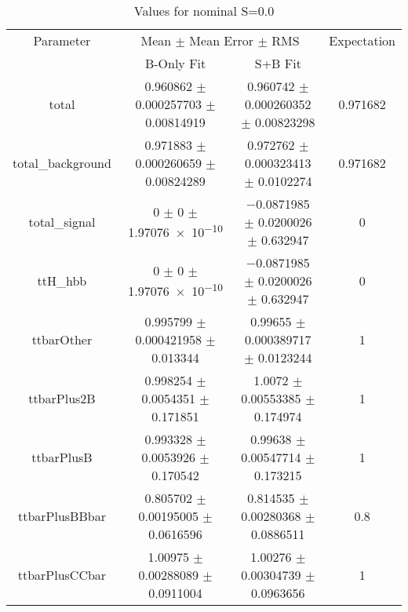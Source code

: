 \begin{table}
\centering
\caption{Values for nominal S=0.0}
\begin{tabular}{cccc}
\toprule
Parameter & \multicolumn{2}{c}{Mean $\pm$ Mean Error $\pm$ RMS} & Expectation\\
 & B-Only Fit & S+B Fit & \\
\midrule
total & \num{0.960862} $\pm$ \num{0.000257703} $\pm$ \num{0.00814919} & \num{0.960742} $\pm$ \num{0.000260352} $\pm$ \num{0.00823298} & \num{0.971682}\\
total\_background & \num{0.971883} $\pm$ \num{0.000260659} $\pm$ \num{0.00824289} & \num{0.972762} $\pm$ \num{0.000323413} $\pm$ \num{0.0102274} & \num{0.971682}\\
total\_signal & \num{0} $\pm$ \num{0} $\pm$ \num{1.97076e-10} & \num{-0.0871985} $\pm$ \num{0.0200026} $\pm$ \num{0.632947} & \num{0}\\
ttH\_hbb & \num{0} $\pm$ \num{0} $\pm$ \num{1.97076e-10} & \num{-0.0871985} $\pm$ \num{0.0200026} $\pm$ \num{0.632947} & \num{0}\\
ttbarOther & \num{0.995799} $\pm$ \num{0.000421958} $\pm$ \num{0.013344} & \num{0.99655} $\pm$ \num{0.000389717} $\pm$ \num{0.0123244} & \num{1}\\
ttbarPlus2B & \num{0.998254} $\pm$ \num{0.0054351} $\pm$ \num{0.171851} & \num{1.0072} $\pm$ \num{0.00553385} $\pm$ \num{0.174974} & \num{1}\\
ttbarPlusB & \num{0.993328} $\pm$ \num{0.0053926} $\pm$ \num{0.170542} & \num{0.99638} $\pm$ \num{0.00547714} $\pm$ \num{0.173215} & \num{1}\\
ttbarPlusBBbar & \num{0.805702} $\pm$ \num{0.00195005} $\pm$ \num{0.0616596} & \num{0.814535} $\pm$ \num{0.00280368} $\pm$ \num{0.0886511} & \num{0.8}\\
ttbarPlusCCbar & \num{1.00975} $\pm$ \num{0.00288089} $\pm$ \num{0.0911004} & \num{1.00276} $\pm$ \num{0.00304739} $\pm$ \num{0.0963656} & \num{1}\\
\bottomrule
\end{tabular}
\end{table}